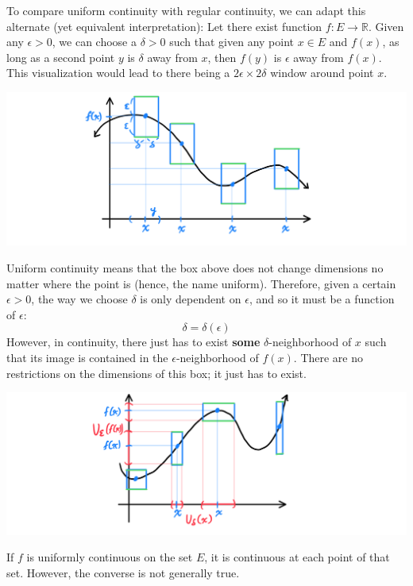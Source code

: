 \documentclass{article}
\begin{document}
    To compare uniform continuity with regular continuity, we can adapt this alternate (yet equivalent interpretation): Let there exist function $f: E \longrightarrow \mathbb{R}$. Given any $\epsilon>0$, we can choose a $\delta>0$ such that given any point $x \in E$ and $f(x)$, as long as a second point $y$ is $\delta$ away from $x$, then $f(y)$ is $\epsilon$ away from $f(x)$. This visualization would lead to there being a $2\epsilon \times 2\delta$ window around point $x$. 
    \begin{center}
        \includegraphics[scale=0.3]{img/Double_Epsilon_Delta_Uniform_Continuity.PNG}
    \end{center}
    Uniform continuity means that the box above does not change dimensions no matter where the point is (hence, the name uniform). Therefore, given a certain $\epsilon > 0$, the way we choose $\delta$ is only dependent on $\epsilon$, and so it must be a function of $\epsilon$: 
    \[\delta = \delta(\epsilon)\]
    However, in continuity, there just has to exist \textbf{some} $\delta$-neighborhood of $x$ such that its image is contained in the $\epsilon$-neighborhood of $f(x)$. There are no restrictions on the dimensions of this box; it just has to exist. 
    \begin{center}
        \includegraphics[scale=0.28]{img/Regular_Continuity_Box_Visual.PNG}
    \end{center}

    \begin{lemma}
      If $f$ is uniformly continuous on the set $E$, it is continuous at each point of that set. However, the converse is not generally true. 
    \end{lemma}
\end{document}
